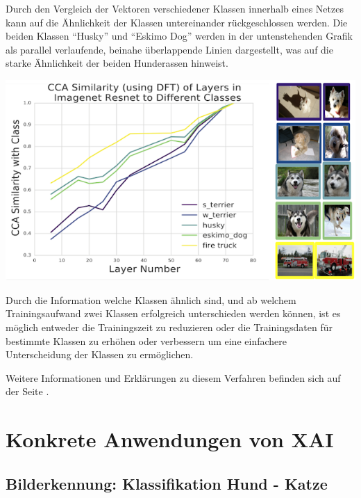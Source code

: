 \documentclass[
  12pt, %
  a4paper, %
  oneside, %
  openany, 
  numbers=noenddot, %
  BCOR=5mm, %
  parskip=half*, %
  thesis, %
]{bfhbook}
\begin{document}
Durch den Vergleich der Vektoren verschiedener Klassen innerhalb eines Netzes kann auf die Ähnlichkeit der Klassen untereinander rückgeschlossen werden. Die beiden Klassen ``Husky'' und ``Eskimo Dog'' werden in der untenstehenden Grafik als parallel verlaufende, beinahe überlappende Linien dargestellt, was auf die starke Ähnlichkeit der beiden Hunderassen hinweist.
\begin{center}
\begin{minipage}[t]{\linewidth}
 	\includegraphics[width=\textwidth]{Bilder/svcca-similarities.png}
\end{minipage}
\end{center}

Durch die Information welche Klassen ähnlich sind, und ab welchem Trainingsaufwand zwei Klassen erfolgreich unterschieden werden können, ist es möglich entweder die Trainingszeit zu reduzieren oder die Trainingsdaten für bestimmte Klassen zu erhöhen oder verbessern um eine einfachere Unterscheidung der Klassen zu ermöglichen.

Weitere Informationen und Erklärungen zu diesem Verfahren befinden sich auf der Seite \parencite{svccaLink}.

\chapter{Konkrete Anwendungen von XAI}

\section{Bilderkennung: Klassifikation Hund - Katze}
\end{document}
